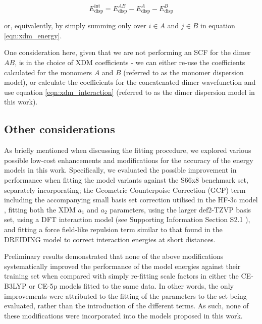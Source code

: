 \documentclass[preprint]{iucr}              %
\begin{document}
\begin{equation}
    \label{eqn:xdm_interaction}
    E^\text{int}_\text{disp} = E^{AB}_\text{disp} - E^A_\text{disp} - E^B_\text{disp}
\end{equation}

or, equivalently, by simply summing only over $i \in A$ and $j \in B$ in equation \ref{eqn:xdm_energy}.

One consideration here, given that we are not performing an SCF for the dimer $AB$, is in the choice of XDM coefficients - we can
either re-use the coefficients calculated for the monomers $A$  and $B$ (referred to as the monomer dispersion model),
or calculate the coefficients for the concatenated dimer wavefunction and use equation \ref{eqn:xdm_interaction} (referred to as
the dimer dispersion model in this work).


\subsection{Other considerations}
\label{sec:other_considerations}
As briefly mentioned when discussing the fitting procedure, we explored various possible low-cost enhancements and
modifications for the accuracy of the energy models in this work.
Specifically, we evaluated the possible improvement in performance when fitting the model variants against 
the S66x8 \cite{Rezac2011a,Rezac2011b,Brauer2016} benchmark
set, separately incorporating; the Geometric Counterpoise Correction (GCP) term \cite{Kruse2012} including the accompanying 
small basis set correction utilised in the HF-3c model \cite{Sure2013}, fitting both the XDM $a_1$ and $a_2$ parameters, using 
the larger def2-TZVP basis set, using a DFT interaction model (see Supporting Information Section S2.1 %
), and fitting a 
force field-like repulsion term similar to that found in the DREIDING model \cite{Mayo1990}
to correct interaction energies at short distances.

Preliminary results demonstrated that none of the above modifications systematically improved the performance of 
the model energies against their training set when compared with simply re-fitting scale factors in 
either the CE-B3LYP or CE-5p models fitted to the same data. In other words, 
the only improvements were  attributed to the fitting of the parameters to the set being evaluated, 
rather than the introduction of the different terms. As such, none of these modifications were incorporated 
into the models proposed in this work.
\end{document}
